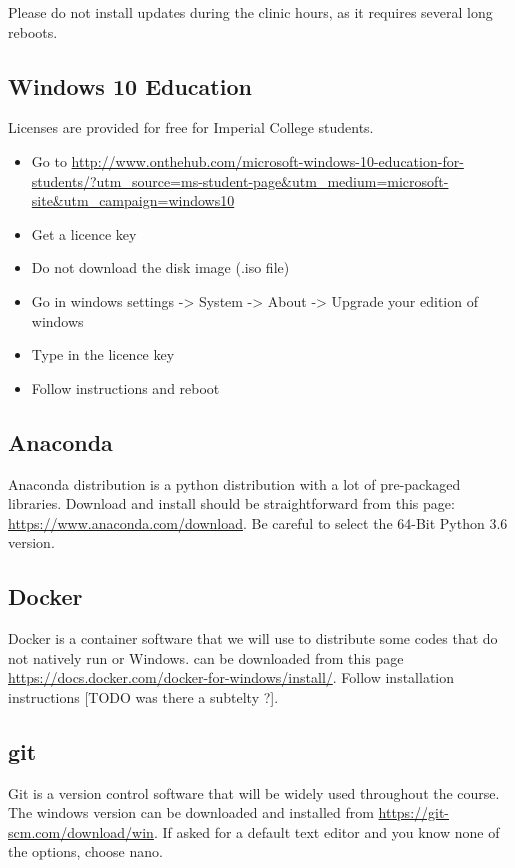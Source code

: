 \documentclass[11pt]{article}
\begin{document}
Please do not install updates during the clinic hours, as it requires several long reboots.

\subsection{Windows 10 Education}

Licenses are provided for free for Imperial College students.
\begin{itemize}
  \item Go to \url{http://www.onthehub.com/microsoft-windows-10-education-for-students/?utm_source=ms-student-page&utm_medium=microsoft-site&utm_campaign=windows10}
  \item Get a licence key
  \item Do not download the disk image (.iso file)
  \item Go in windows settings -> System -> About -> Upgrade your edition of windows
  \item Type in the licence key
  \item Follow instructions and reboot
\end{itemize}

\subsection{Anaconda}

Anaconda distribution is a python distribution with a lot of pre-packaged libraries. Download and install should be straightforward from this page: \url{https://www.anaconda.com/download}. Be careful to select the 64-Bit Python 3.6 version.

\subsection{Docker}

Docker is a container software that we will use to distribute some codes that do not natively run or Windows. can be downloaded from this page \url{https://docs.docker.com/docker-for-windows/install/}. Follow installation instructions [TODO was there a subtelty ?].

\subsection{git}

Git is a version control software that will be widely used throughout the course. The windows version can be downloaded and installed from \url{https://git-scm.com/download/win}. If asked for a default text editor and you know none of the options, choose nano.
\end{document}
